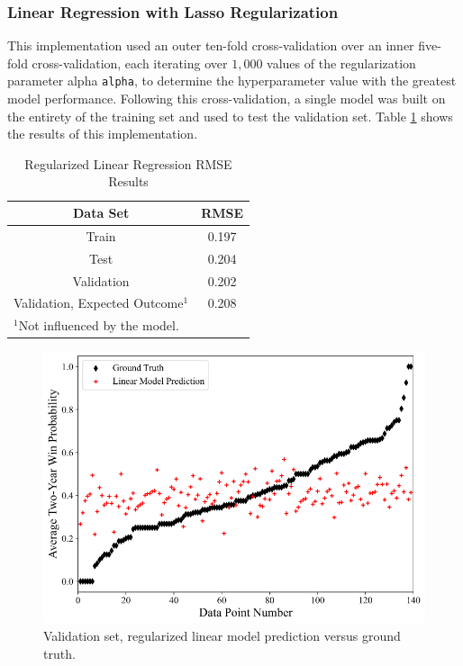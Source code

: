 \documentclass[conference]{IEEEtran}
\begin{document}
\subsubsection{Linear Regression with Lasso Regularization}
This implementation used an outer ten-fold cross-validation over an inner five-fold cross-validation, each iterating over $1,000$ values of the regularization parameter alpha \verb|alpha|, to determine the hyperparameter value with the greatest model performance. Following this cross-validation, a single model was built on the entirety of the training set and used to test the validation set. Table \ref{tab2} shows the results of this implementation.



\begin{table}[htbp]
\caption{Regularized Linear Regression RMSE Results}
\begin{center}
\begin{tabular}{|c||c|}
\hline
\textbf{Data Set} & \textbf{RMSE} \\
\hline
\hline
Train & 0.197 \\
\hline
Test & 0.204 \\
\hline
Validation & 0.202 \\
\hline
Validation, Expected Outcome$^{\mathrm{1}}$ & 0.208 \\
\hline
\multicolumn{2}{l}{$^{\mathrm{1}}$Not influenced by the model.}
\end{tabular}
\label{tab2}
\end{center}
\end{table}

\begin{figure}[htbp]
\centerline{\includegraphics[width=1\linewidth]{test1.png}}
\caption{Validation set, regularized linear model prediction versus ground truth.}
\label{fig4}
\end{figure}
\end{document}
